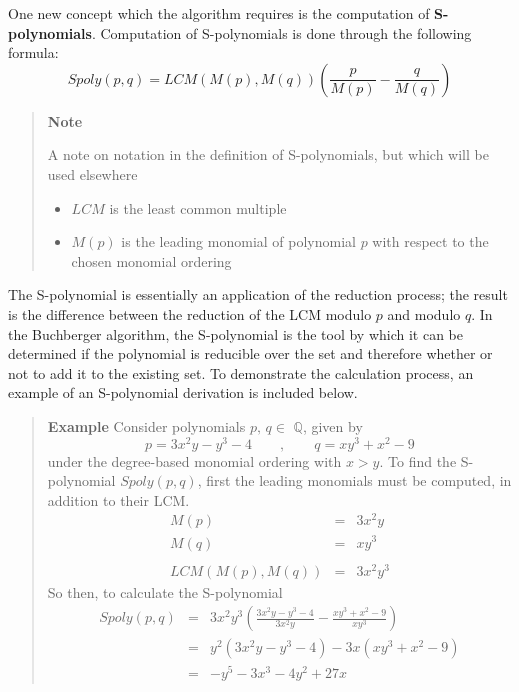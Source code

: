 \documentclass[letterpaper,12pt,titlepage,oneside,final]{book}
\newenvironment{example}{\begin{quote}%
  \textbf{Example }%
  \quad
}{%
\end{quote}%
}
\newenvironment{note}{\begin{quote}%
  \textbf{Note }%
  \quad
}{%
\end{quote}%
}
\begin{document}
One new concept which the algorithm requires is the computation of \textbf{S-polynomials}.  Computation of S-polynomials is done through the following formula: 
\begin{equation*}
  Spoly( p, q) = LCM(M(p), M(q)) \left( \frac{p}{M(p)} - \frac{q}{M(q)}\right)
\end{equation*}
\begin{note}
  A note on notation in the definition of S-polynomials, but which will be used elsewhere
  \begin{itemize}
    \item ${LCM}$ is the least common multiple
    \item ${M(p)}$ is the leading monomial of polynomial ${p}$ with respect to the chosen monomial ordering 
  \end{itemize}
\end{note}

The S-polynomial is essentially an application of the reduction process; the result is the difference between the reduction of the LCM modulo ${p}$ and modulo ${q}$.  In the Buchberger algorithm, the S-polynomial is the tool by which it can be determined if the polynomial is reducible over the set and therefore whether or not to add it to the existing set.  To demonstrate the calculation process, an example of an S-polynomial derivation is included below.

\begin{example}\label{S-polynomial}
  Consider polynomials ${p, \, q \in }$ $\mathbb{Q}$, given by 
  \begin{equation*}
    p = 3x^2y - y^3 - 4 \qquad , \qquad q = xy^3 + x^2 -9
  \end{equation*}
  under the degree-based monomial ordering with ${x > y}$.  To find the S-polynomial ${Spoly( p, q)}$, first the leading monomials must be computed, in addition to their LCM.
  \begin{eqnarray*}
    M( p) &=& 3x^2y\\
    M( q) &=& xy^3\\\\
    LCM( M( p), M( q)) &=& 3x^2y^3
  \end{eqnarray*}
  So then, to calculate the S-polynomial
  \begin{eqnarray*}
    Spoly( p, q) &=& 3x^2y^3\left(\frac{3x^2y - y^3 - 4}{3x^2y} - \frac{xy^3 + x^2 -9}{xy^3}\right)\\
           &=& y^2(3x^2y - y^3 - 4) - 3x(xy^3 + x^2 -9)\\
           &=& -y^5 - 3x^3 - 4y^2 + 27x 
  \end{eqnarray*}
\end{example}
\end{document}
